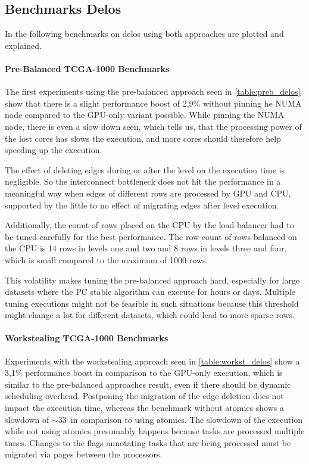 \subsection{Benchmarks Delos}
In the following benchmarks on delos using both approaches are plotted and explained.

\paragraph{Pre-Balanced TCGA-1000 Benchmarks}

The first experiments using the pre-balanced approach seen in \ref{table:preb_delos} show that there is a slight performance boost of 2,9\% without pinning he NUMA node compared to the GPU-only variant possible. While pinning the NUMA node, there is even a slow down seen, which tells us, that the processing power of the lost cores has slows the execution, and more cores should therefore help speeding up the execution. 

The effect of deleting edges during or after the level on the execution time  is negligible. So the interconnect bottleneck does not hit the performance in a meaningful way when edges of different rows are processed by GPU and CPU, supported by the little to no effect of migrating edges after level execution. 

Additionally, the count of rows placed on the CPU by the load-balancer had to be tuned carefully for the best performance. The row count of rows balanced on the CPU is 14 rows in levels one and two and 8 rows in levels three and four, which is small compared to the maximum of 1000 rows.

This volatility makes tuning the pre-balanced approach hard, especially for large datasets where the PC stable algorithm can execute for hours or days. Multiple tuning executions might not be feasible in such situations because this threshold might change a lot for different datasets, which could lead to more sparse rows.

\paragraph{Workstealing TCGA-1000 Benchmarks}

Experiments with the workstealing approach seen in \ref{table:workst_delos} show a 3,1\% performance boost in comparison to the GPU-only execution, which is similar to the pre-balanced approaches result, even if there should be dynamic scheduling overhead. Postponing the migration of the edge deletion does not impact the execution time, whereas the benchmark without atomics shows a slowdown of $\sim$33\ in comparison to using atomics. The slowdown of the execution while not using atomics presumably happens because tasks are processed multiple times. Changes to the flags annotating tasks that are being processed must be migrated via pages between the processors.

